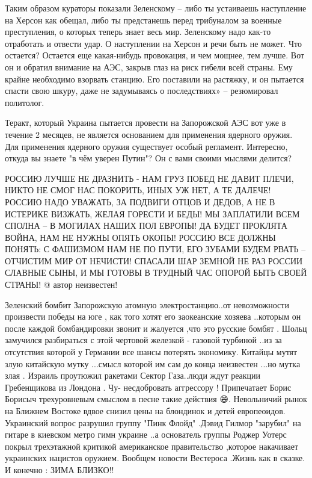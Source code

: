 
Таким образом кураторы показали Зеленскому – либо ты устаиваешь наступление на
Херсон как обещал, либо ты предстанешь перед трибуналом за военные
преступления, о которых теперь знает весь мир. Зеленскому надо как-то
отработать и отвести удар. О наступлении на Херсон и речи быть не может. Что
остается? Остается еще какая-нибудь провокация, и чем мощнее, тем лучше. Вот он
и обратил внимание на АЭС, закрыв глаз на риск гибели всей страны. Ему крайне
необходимо взорвать станцию. Его поставили на растяжку, и он пытается спасти
свою шкуру, даже не задумываясь о последствиях» – резюмировал политолог.


Теракт, который Украина пытается провести на Запорожской АЭС вот уже в течение
2 месяцев, не является основанием для применения ядерного оружия. Для
применения ядерного оружия существует особый регламент. Интересно, откуда вы
знаете "в чём уверен Путин"? Он с вами своими мыслями делится?

РОССИЮ ЛУЧШЕ НЕ ДРАЗНИТЬ -
НАМ ГРУЗ ПОБЕД НЕ ДАВИТ ПЛЕЧИ,
НИКТО НЕ СМОГ НАС ПОКОРИТЬ,
ИНЫХ УЖ НЕТ, А ТЕ ДАЛЕЧЕ!
​РОССИЮ НАДО УВАЖАТЬ,
ЗА ПОДВИГИ ОТЦОВ И ДЕДОВ,
А НЕ В ИСТЕРИКЕ ВИЗЖАТЬ,
ЖЕЛАЯ ГОРЕСТИ И БЕДЫ!
МЫ ЗАПЛАТИЛИ ВСЕМ СПОЛНА –
В МОГИЛАХ НАШИХ ПОЛ ЕВРОПЫ!
ДА БУДЕТ ПРОКЛЯТА ВОЙНА,
НАМ НЕ НУЖНЫ ОПЯТЬ ОКОПЫ!
РОССИЮ ВСЕ ДОЛЖНЫ ПОНЯТЬ:
С ФАШИЗМОМ НАМ НЕ ПО ПУТИ,
ЕГО ЗУБАМИ БУДЕМ РВАТЬ –
ОТЧИСТИМ МИР ОТ НЕЧИСТИ!
СПАСАЛИ ШАР ЗЕМНОЙ НЕ РАЗ
РОССИИ СЛАВНЫЕ СЫНЫ,
И МЫ ГОТОВЫ В ТРУДНЫЙ ЧАС
ОПОРОЙ БЫТЬ СВОЕЙ СТРАНЫ!
@ автор неизвестен!


Зеленский бомбит Запорожскую атомную электростанцию..от невозможности
произвести победы на юге , как того хотят его заокеанские хозяева ..которым он
после каждой бомбандировки звонит и жалуется ,что это русские бомбят . Шольц
замучился разбираться с этой чертовой железкой - газовой турбиной ..из за
отсутствия которой у Германии все шансы потерять экономику. Китайцы мутят злую
китайскую мутку ...смысл которой им сам до конца неизвестен ...но мутка злая .
Израиль проутюжил ракетами Сектор Газа..люди ждут реакции Гребенщикова из
Лондона . Чу- несдобровать аггрессору ! Припечатает Борис Борисыч трехуровневым
смыслом в песне такие действия 😄. Невольничий рынок на Ближнем Востоке вдвое
снизил цены на блондинок и детей европеоидов. Украинский вопрос разрушил группу
"Пинк Флойд" .Дэвид Гилмор "зарубил" на гитаре в киевском метро гимн украине
..а основатель группы Роджер Уотерс покрыл трехэтажной критикой американское
правительство ,которое накачивает украинских нацистов оружием. Вообщем новости
Вестероса .Жизнь как в сказке. И конечно : ЗИМА БЛИЗКО!!

